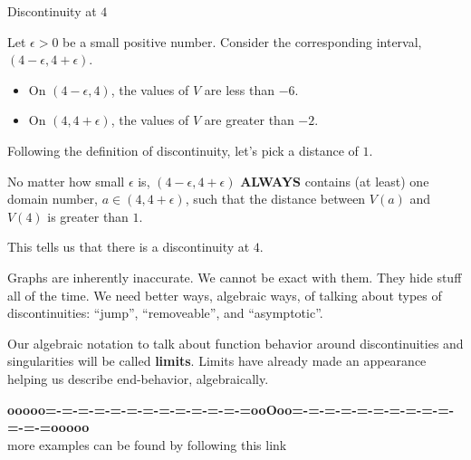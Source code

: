 \documentclass{ximera}
\begin{document}
\begin{explanation} Discontinuity at $4$


Let $\epsilon > 0$ be a small positive number.  Consider the corresponding interval, $(4 - \epsilon, 4 + \epsilon)$.

\begin{itemize}
\item On $(4 - \epsilon, 4)$, the values of $V$ are less than $-6$.
\item On $(4, 4 + \epsilon)$, the values of $V$ are greater than $-2$.
\end{itemize}


Following the definition of discontinuity, let's pick a distance of $1$.


No matter how small $\epsilon$ is, $(4 - \epsilon, 4 + \epsilon)$ \textbf{\textcolor{red!90!darkgray}{ALWAYS}} contains (at least) one domain number, $a \in (4, 4 + \epsilon)$, such that the distance between $V(a)$ and $V(4)$ is greater than $1$.

This tells us that there is a discontinuity at $4$.

\end{explanation}




\begin{notation}


Graphs are inherently inaccurate.  We cannot be exact with them.  They hide stuff all of the time. We need better ways, algebraic ways, of talking about types of discontinuities: ``jump'', ``removeable'', and ``asymptotic''.

Our algebraic notation to talk about function behavior around discontinuities and singularities will be called \textbf{\textcolor{purple!85!blue}{limits}}.  Limits have already made an appearance helping us describe end-behavior, algebraically.
\end{notation}





















\begin{center}
\textbf{\textcolor{green!50!black}{ooooo=-=-=-=-=-=-=-=-=-=-=-=-=ooOoo=-=-=-=-=-=-=-=-=-=-=-=-=ooooo}} \\

more examples can be found by following this link\\ 

\end{center}
\end{document}
